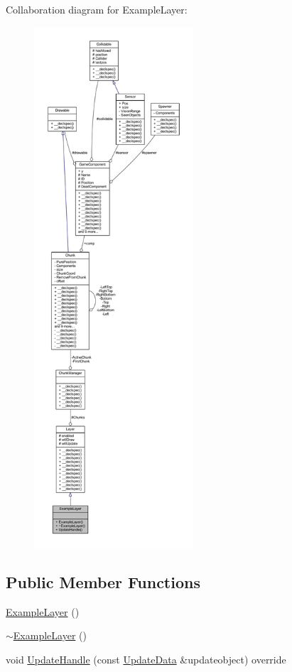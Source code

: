 Collaboration diagram for Example\-Layer\-:
\nopagebreak
\begin{figure}[H]
\begin{center}
\leavevmode
\includegraphics[height=550pt]{class_example_layer__coll__graph}
\end{center}
\end{figure}
\subsection*{Public Member Functions}
\begin{DoxyCompactItemize}
\item 
\hyperlink{class_example_layer_a199ad822f707990b69e998a9ed7df5bb}{Example\-Layer} ()
\item 
\hyperlink{class_example_layer_a243387a90a54149af7d128301e836522}{$\sim$\-Example\-Layer} ()
\item 
void \hyperlink{class_example_layer_a97b36d082a4b5dd7e145773fca666490}{Update\-Handle} (const \hyperlink{class_update_data}{Update\-Data} \&updateobject) override
\end{DoxyCompactItemize}
